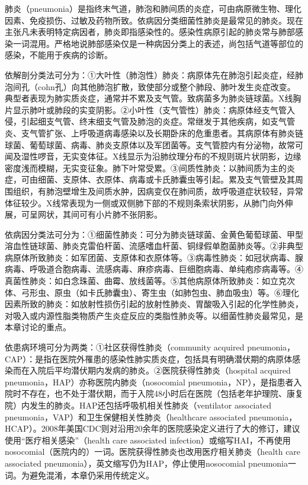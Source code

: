 肺炎（pneumonia）是指终末气道，肺泡和肺间质的炎症，可由病原微生物、理化因素、免疫损伤、过敏及药物所致。依病因分类细菌性肺炎是最常见的肺炎。现在主张凡未表明特定病因者，肺炎即指感染性的。感染性病原引起的肺炎常与肺部感染一词混用。严格地说肺部感染仅是一种病因分类上的表述，尚包括气道等部位的感染，不能用于疾病的诊断。

依解剖分类法可分为：①大叶性（肺泡性）肺炎：病原体先在肺泡引起炎症，经肺泡间孔（cohn孔）向其他肺泡扩散，致使部分或整个肺段、肺叶发生炎症改变。典型者表现为肺实质炎症，通常并不累及支气管。致病菌多为肺炎链球菌。X线胸片显示肺叶或肺段的实变阴影。②小叶性（支气管性）肺炎：病原体经支气管入侵，引起细支气管、终末细支气管及肺泡的炎症。常继发于其他疾病，如支气管炎、支气管扩张、上呼吸道病毒感染以及长期卧床的危重患者。其病原体有肺炎链球菌、葡萄球菌、病毒、肺炎支原体以及军团菌等。支气管腔内有分泌物，故常可闻及湿性啰音，无实变体征。X线显示为沿肺纹理分布的不规则斑片状阴影，边缘密度浅而模糊，无实变征象。肺下叶常受累。③间质性肺炎：以肺间质为主的炎症，可由细菌、支原体、衣原体、病毒或卡氏肺囊虫等引起。累及支气管壁及其周围组织，有肺泡壁增生及间质水肿，因病变仅在肺间质，故呼吸道症状较轻，异常体征较少。X线常表现为一侧或双侧肺下部的不规则条索状阴影，从肺门向外伸展，可呈网状，其间可有小片肺不张阴影。

依病因分类法可分为：①细菌性肺炎：可分为肺炎链球菌、金黄色葡萄球菌、甲型溶血性链球菌、肺炎克雷伯杆菌、流感嗜血杆菌、铜绿假单胞菌肺炎等。②非典型病原体所致肺炎：如军团菌、支原体和衣原体等。③病毒性肺炎：如冠状病毒、腺病毒、呼吸道合胞病毒、流感病毒、麻疹病毒、巨细胞病毒、单纯疱疹病毒等。④真菌性肺炎：如白念珠菌、曲霉、放线菌等。⑤其他病原体所致肺炎：如立克次体、弓形虫、原虫（如卡氏肺囊虫）、寄生虫（如肺包虫、肺血吸虫）等。⑥理化因素所致的肺炎：如放射性损伤引起的放射性肺炎、胃酸吸入引起的化学性肺炎，对吸入或内源性脂类物质产生炎症反应的类脂性肺炎等。以细菌性肺炎最常见，是本章讨论的重点。

依患病环境可分为两类：①社区获得性肺炎（community acquired
pneumonia，CAP）：是指在医院外罹患的感染性肺实质炎症，包括具有明确潜伏期的病原体感染而在入院后平均潜伏期内发病的肺炎。②医院获得性肺炎（hospital
acquired pneumonia，HAP）亦称医院内肺炎（nosocomial
pneumonia，NP），是指患者入院时不存在，也不处于潜伏期，而于入院48小时后在医院（包括老年护理院、康复院）内发生的肺炎。HAP还包括呼吸机相关性肺炎（ventilator
associated pneumonia，VAP）和卫生保健相关性肺炎（healthcare associated
pneumonia，HCAP）。2008年美国CDC则对沿用20余年的医院感染定义进行了大的修订，建议使用“医疗相关感染”（health
care associated
infection）或缩写HAI，不再使用nosocomial（医院内的）一词。医院获得性肺炎也改用医疗相关肺炎（health
care associated pneumonia），英文缩写仍为HAP，停止使用nosocomial
pneumonia一词。为避免混淆，本章仍采用传统定义。

